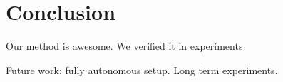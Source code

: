 
\section{Conclusion}

Our method is awesome.
We verified it in experiments

Future work: fully autonomous setup. Long term experiments.
